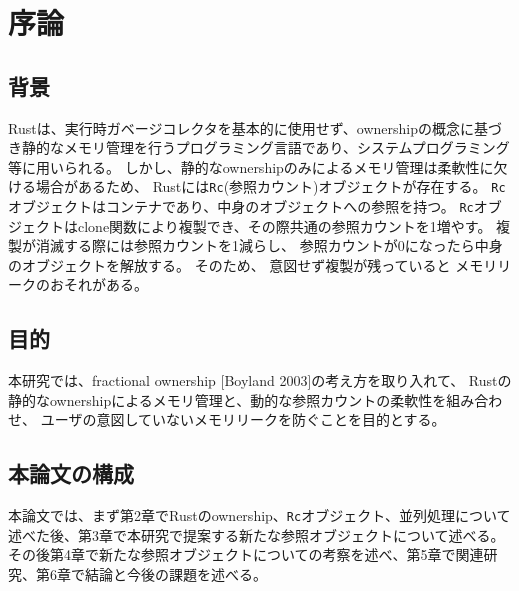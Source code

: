 \documentclass{sumiilab-paper}
\theoremstyle{mystyle}
\numberwithin{definition}{chapter} %
\begin{document}
\begin{abstract}

\end{abstract}

\tableofcontents%

\mainmatter%

\chapter{序論}

\section{背景}
Rustは、実行時ガベージコレクタを基本的に使用せず、ownershipの概念に基づき静的なメモリ管理を行うプログラミング言語であり、システムプログラミング等に用いられる。
しかし、静的なownershipのみによるメモリ管理は柔軟性に欠ける場合があるため、
Rustには\texttt{Rc}(参照カウント)オブジェクトが存在する。
\texttt{Rc}オブジェクトはコンテナであり、中身のオブジェクトへの参照を持つ。
\texttt{Rc}オブジェクトはclone関数により複製でき、その際共通の参照カウントを1増やす。
複製が消滅する際には参照カウントを1減らし、
参照カウントが0になったら中身のオブジェクトを解放する。
そのため、
意図せず複製が残っていると
メモリリークのおそれがある。
\section{目的}
本研究では、fractional ownership [Boyland 2003]の考え方を取り入れて、
Rustの静的なownershipによるメモリ管理と、動的な参照カウントの柔軟性を組み合わせ、
ユーザの意図していないメモリリークを防ぐことを目的とする。

\section{本論文の構成}
本論文では、まず第2章でRustのownership、\texttt{Rc}オブジェクト、並列処理について述べた後、第3章で本研究で提案する新たな参照オブジェクトについて述べる。その後第4章で新たな参照オブジェクトについての考察を述べ、第5章で関連研究、第6章で結論と今後の課題を述べる。
\end{document}
